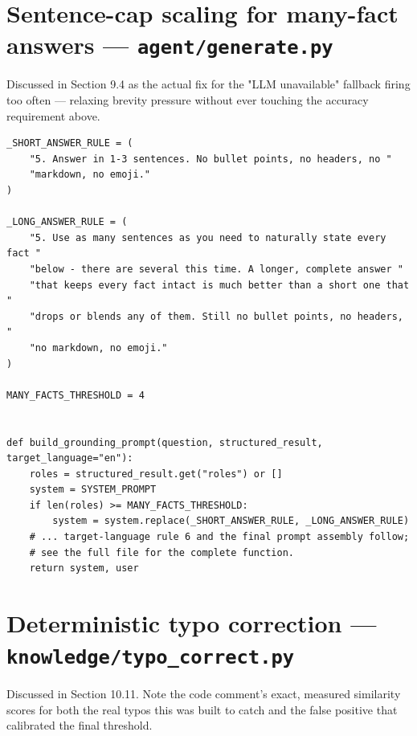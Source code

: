 \section{Sentence-cap scaling for many-fact answers — \texttt{agent/\allowbreak{}generate.py}}
Discussed in Section 9.4 as the actual fix for the "LLM unavailable" fallback firing too often — relaxing brevity pressure without ever touching the accuracy requirement above.

\begin{lstlisting}[caption={agent/generate.py — build\_grounding\_prompt, abbreviated}]
_SHORT_ANSWER_RULE = (
    "5. Answer in 1-3 sentences. No bullet points, no headers, no "
    "markdown, no emoji."
)

_LONG_ANSWER_RULE = (
    "5. Use as many sentences as you need to naturally state every fact "
    "below - there are several this time. A longer, complete answer "
    "that keeps every fact intact is much better than a short one that "
    "drops or blends any of them. Still no bullet points, no headers, "
    "no markdown, no emoji."
)

MANY_FACTS_THRESHOLD = 4


def build_grounding_prompt(question, structured_result, target_language="en"):
    roles = structured_result.get("roles") or []
    system = SYSTEM_PROMPT
    if len(roles) >= MANY_FACTS_THRESHOLD:
        system = system.replace(_SHORT_ANSWER_RULE, _LONG_ANSWER_RULE)
    # ... target-language rule 6 and the final prompt assembly follow;
    # see the full file for the complete function.
    return system, user
\end{lstlisting}
\section{Deterministic typo correction — \texttt{knowledge/\allowbreak{}typo\_\allowbreak{}correct.py}}
Discussed in Section 10.11. Note the code comment's exact, measured similarity scores for both the real typos this was built to catch and the false positive that calibrated the final threshold.

